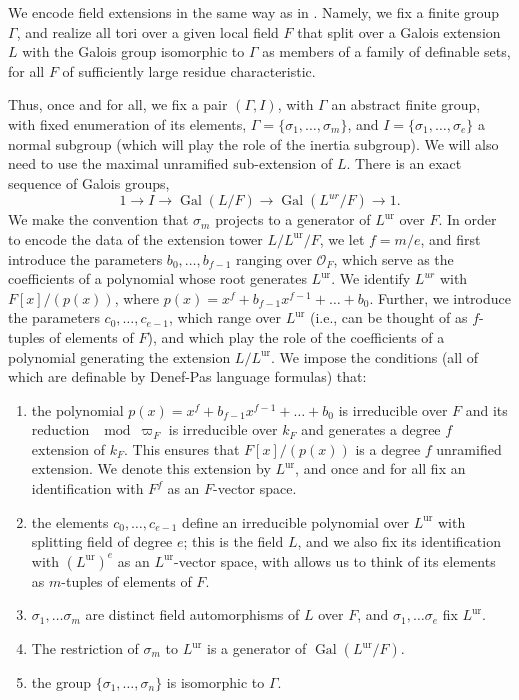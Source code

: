 \documentclass{amsart}
\newcommand{\ri}{\mathcal{O}}
\newcommand{\gal}{\operatorname{Gal}}
\newcommand{\ur}{\mathrm{ur}}
\theoremstyle{plain}
\theoremstyle{definition}
\begin{document}
We encode field extensions in the same way as in \cite{CGH-2}. Namely, we fix a finite group $\Gamma$, and realize all tori over a given local field $F$ that split over a Galois extension $L$ with the Galois group 
isomorphic to $\Gamma$ as members of a family of definable sets, for all $F$ of sufficiently large residue characteristic. 

Thus, once and for all, we fix a pair $(\Gamma,I)$,  with $\Gamma$ an abstract finite group, with fixed enumeration of its elements, $\Gamma=\{\sigma_1, \dots, \sigma_m\}$, and 
$I=\{\sigma_1, \dots, \sigma_e\}$
a normal subgroup (which will play the role of the inertia subgroup). We will also need to use the maximal unramified sub-extension of $L$.
There is an exact sequence of Galois groups, 
$$ 1\to I \to \gal(L/F)\to \gal(L^{ur}/F)\to 1.$$
We 
make the convention that $\sigma_m$ projects to a generator of $L^{\ur}$ over $F$. 
In order to encode the data of the extension tower $L/L^{\ur}/F$, we let $f=m/e$, and first introduce the parameters $b_0,\dots, b_{f-1}$ ranging over $\ri_F$, which serve as the coefficients of a polynomial whose root generates $L^{\ur}$. 
We identify $L^{ur}$ with   $F[x]/(p(x))$, where $p(x)=x^f+b_{f-1}x^{f-1}+ \dots + b_0$. 
Further, we introduce the parameters $c_0, \dots, c_{e-1}$, which range over 
$L^{\ur}$ (i.e., can be thought of as $f$-tuples of elements of $F$), and which play the role of the coefficients of a polynomial generating the extension $L/L^{\ur}$. 
We impose the conditions (all of which are definable by Denef-Pas language formulas) that: 
\begin{enumerate}
\item the polynomial $p(x)=x^f+b_{f-1}x^{f-1}+ \dots + b_0$ is irreducible over $F$ and its reduction 
$\mod \varpi_F$ is irreducible over $k_F$ and generates a degree $f$ extension of $k_F$. 
This ensures that $F[x]/(p(x))$ is a degree $f$ unramified extension. 
We denote this extension by $L^\ur$, and once and for all fix an identification with $F^f$ as 
an $F$-vector space. 
\item  the elements $c_0, \dots, c_{e-1}$ define an irreducible polynomial over $L^\ur$ with splitting field of degree $e$; this is the field $L$, and we also fix its identification with 
$(L^\ur)^e$ as an $L^\ur$-vector space, with allows us to think of its elements as $m$-tuples of elements of $F$. 
\item $\sigma_1, \dots \sigma_m$ are distinct field automorphisms of $L$ over $F$, and 
 $\sigma_1, \dots \sigma_e$ fix $L^\ur$.
\item The restriction of $\sigma_m$ to $L^\ur$ is a generator of $\gal(L^\ur/F)$. 
\item the group $\{\sigma_1, \dots, \sigma_n\}$ is isomorphic to $\Gamma$.
\end{enumerate}
\end{document}
